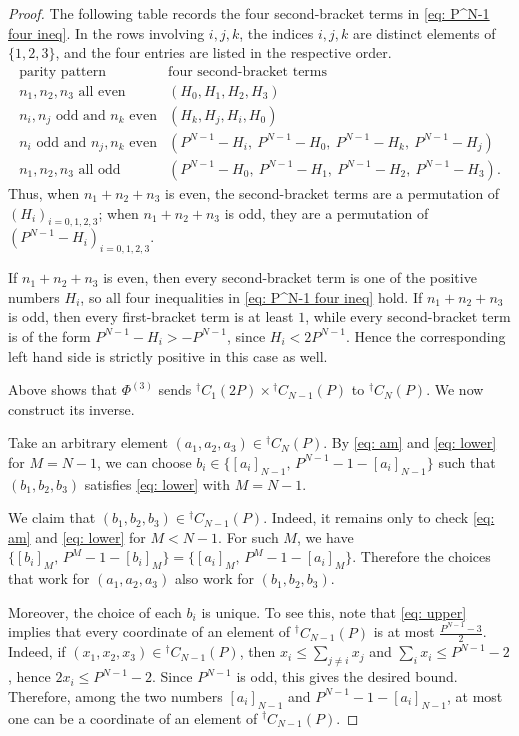 \documentclass[10pt,a4paper]{amsart}
\begin{document}
\begin{proof}
The following table records the four second-bracket terms in
\eqref{eq: P^N-1 four ineq}.  In the rows involving $i,j,k$, the indices
$i,j,k$ are distinct elements of $\{1,2,3\}$, and the four entries are listed
in the respective order.
\[
\begin{array}{c|c}
\text{parity pattern} & \text{four second-bracket terms} \\ \hline
n_1,n_2,n_3 \text{ all even}
& (H_0,H_1,H_2,H_3)\\
n_i,n_j \text{ odd and } n_k \text{ even}
& (H_k,H_j,H_i,H_0)\\
n_i \text{ odd and } n_j,n_k \text{ even}
& (P^{N-1}-H_i,\ P^{N-1}-H_0,\ P^{N-1}-H_k,\ P^{N-1}-H_j)\\
n_1,n_2,n_3 \text{ all odd}
& (P^{N-1}-H_0,\ P^{N-1}-H_1,\ P^{N-1}-H_2,\ P^{N-1}-H_3).
\end{array}
\]
Thus, when $n_1+n_2+n_3$ is even, the second-bracket terms are a permutation
of $(H_i)_{i=0,1,2,3}$; when $n_1+n_2+n_3$ is odd, they are a permutation of
$(P^{N-1}-H_i)_{i=0,1,2,3}$.

If $n_1+n_2+n_3$ is even, then every second-bracket term is one of the positive
numbers $H_i$, so all four inequalities in \eqref{eq: P^N-1 four ineq} hold.
If $n_1+n_2+n_3$ is odd, then every first-bracket term is at least $1$, while
every second-bracket term is of the form $P^{N-1}-H_i>-P^{N-1}$, since
$H_i<2P^{N-1}$.  Hence the corresponding left hand side is strictly positive
in this case as well.

Above shows that $\Phi^{(3)}$ sends ${}^\dagger C_1(2P)\times {}^\dagger C_{N-1}(P)$ to ${}^\dagger C_{N}(P)$. We now construct its inverse.


Take an arbitrary element $(a_1,a_2,a_3)\in{}^\dagger C_N(P)$.
  By \eqref{eq: am} and \eqref{eq: lower} for \(M=N-1\), we can
choose
$b_i\in\{[a_i]_{N-1},\,P^{N-1}-1-[a_i]_{N-1}\}$
such that $(b_1,b_2,b_3)$ satisfies \eqref{eq: lower} with $M=N-1$.

We claim that $(b_1,b_2,b_3)\in{}^\dagger C_{N-1}(P)$.  Indeed, it remains
only to check \eqref{eq: am} and \eqref{eq: lower} for $M<N-1$. 
For such $M$,  we have $\{[b_i]_M,\,P^M-1-[b_i]_M\}
=
\{[a_i]_M,\,P^M-1-[a_i]_M\}$.
Therefore the choices that work for $(a_1,a_2,a_3)$ also work for
$(b_1,b_2,b_3)$.

Moreover, the choice of each $b_i$ is unique.  To see this, note that
\eqref{eq: upper} implies that every coordinate of an element of ${}^\dagger C_{N-1}(P)$ is at most $\frac{P^{N-1}-3}{2}$.
Indeed, if $(x_1,x_2,x_3)\in{}^\dagger C_{N-1}(P)$, then
$x_i\leq \sum_{j\neq i}x_j$ and $\sum_i x_i\leq P^{N-1}-2$, hence $2x_i\leq P^{N-1}-2$.  Since $P^{N-1}$ is odd, this gives the desired
bound.  
Therefore, among the two numbers $[a_i]_{N-1}$ and $P^{N-1}-1-[a_i]_{N-1}$,
at most one can be a coordinate of an element of
${}^\dagger C_{N-1}(P)$.


\end{proof}
\end{document}
